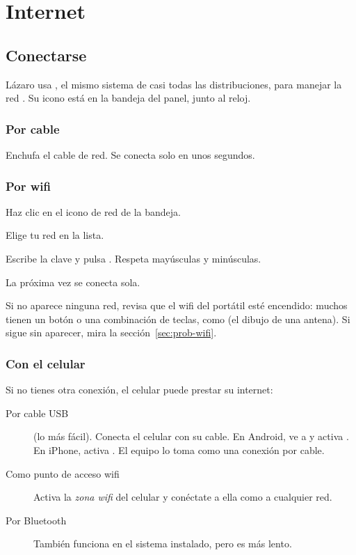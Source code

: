 \chapter{Internet}\label{cap:07-internet}

\section{Conectarse}\label{sec:conectarse}

Lázaro usa , el mismo sistema de casi todas las
distribuciones, para manejar la red \cite{networkmanager}. Su icono está
en la bandeja del panel, junto al reloj.

\subsection{Por cable}
Enchufa el cable de red. Se conecta solo en unos segundos.

\subsection{Por wifi}
\begin{pasos}
  \item Haz clic en el icono de red de la bandeja.
  \item Elige tu red en la lista.
  \item Escribe la clave y pulsa . Respeta mayúsculas y
        minúsculas.
\end{pasos}
La próxima vez se conecta sola.


Si no aparece ninguna red, revisa que el wifi del portátil esté encendido:
muchos tienen un botón o una combinación de teclas, como 
(el dibujo de una antena). Si sigue sin aparecer, mira la
sección~\ref{sec:prob-wifi}.

\subsection{Con el celular}
Si no tienes otra conexión, el celular puede prestar su internet:
\begin{description}
  \item[Por cable USB] (lo más fácil). Conecta el celular con su cable. En
    Android, ve a 
    y activa . En iPhone, activa
    . El equipo lo toma como una conexión por
    cable.
  \item[Como punto de acceso wifi] Activa la \emph{zona wifi} del celular y
    conéctate a ella como a cualquier red.
  \item[Por Bluetooth] También funciona en el sistema instalado, pero es
    más lento.
\end{description}

